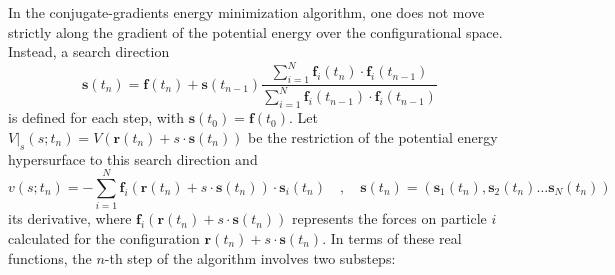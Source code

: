 \documentclass[10pt,a4paper]{report}
\numberwithin{equation}{section}
\newcommand{\fsub}[1]{\mathbf{f}_{#1}}
\begin{document}
In the conjugate-gradients energy minimization algorithm, one does not move strictly along the gradient of the potential energy over the configurational space.
Instead, a search direction
\begin{equation}
  \label{eq:em-cg-search}
   \mathbf{s}(t_n) = \mathbf{f}(t_n) + \mathbf{s}(t_{n-1}) \frac{\sum_{i=1}^{N}\fsub{i}(t_n)\cdot\fsub{i}(t_{n-1})}{\sum_{i=1}^{N}\fsub{i}(t_{n-1})\cdot\fsub{i}(t_{n-1})} 
\end{equation}
is defined for each step, with $\mathbf{s}(t_0) = \mathbf{f}(t_0)$.
Let $V|_s(s;t_n) = V(\mathbf{r}(t_n) + s\cdot\mathbf{s}(t_n))$ be the restriction of the potential energy hypersurface to this search direction and
\begin{equation*}
  v(s;t_n) = - \sum_{i=1}^N \mathbf{f}_i(\mathbf{r}(t_n) + s\cdot\mathbf{s}(t_n)) \cdot \mathbf{s}_i(t_n) \quad , \quad \mathbf{s}(t_n) = (\mathbf{s}_1(t_n),\mathbf{s}_2(t_n) \ldots \mathbf{s}_N(t_n))
\end{equation*}
its derivative, where $\mathbf{f}_i(\mathbf{r}(t_n) + s\cdot\mathbf{s}(t_n))$ represents the forces on particle $i$ calculated for the configuration $\mathbf{r}(t_n) + s\cdot\mathbf{s}(t_n)$.
In terms of these real functions, the $n$-th step of the algorithm involves two substeps:
\end{document}
